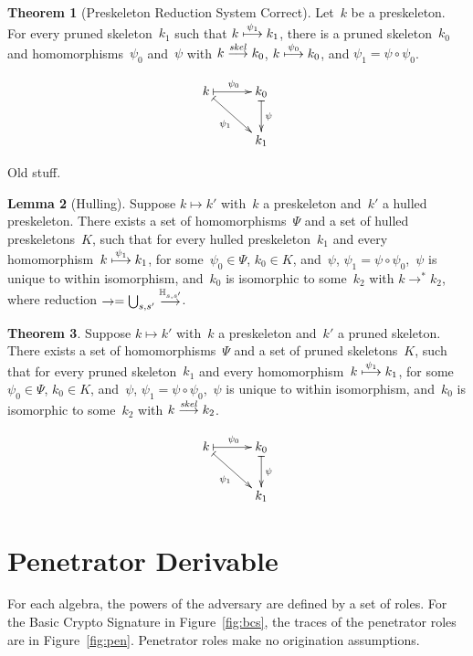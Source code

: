 \documentclass[12pt]{article}
\theoremstyle{definition}
\newtheorem{thm}{Theorem}[section]
\newtheorem{lem}[thm]{Lemma}
\newenvironment{note}{\itshape\par\noindent}{}
\begin{document}
\begin{thm}[Preskeleton Reduction System Correct]\label{thm:prsc}
Let~$k$ be a preskeleton.  For every pruned skeleton~$k_1$ such that
$k\stackrel{\psi_1}{\longmapsto}k_1$, there is a pruned skeleton~$k_0$ and
homomorphisms~$\psi_0$ and~$\psi$ with $k\stackrel{\operatorname{\mathit{skel}}}{\longrightarrow}k_0$,
$k\stackrel{\psi_0}{\longmapsto}k_0$, and $\psi_1=\psi\circ\psi_0$.

$$\xymatrix@C=3em{
k\ar@{|->}[r]^{\psi_0} \ar@{|->}[rd]_{\psi_1} &
k_0 \ar@{|->}[d]^{\psi}\\
&k_1}$$
\end{thm}

\begin{note}
Old stuff.
\end{note}

\begin{lem}[Hulling]
Suppose $k\mapsto k'$ with~$k$ a preskeleton and~$k'$ a hulled
preskeleton.  There exists a set of homomorphisms~$\Psi$ and a set of
hulled preskeletons~$K$, such that for every hulled preskeleton~$k_1$ and
every homomorphism~$k\stackrel{\psi_1}{\longmapsto}k_1$, for
some~$\psi_0\in\Psi$, $k_0\in K$, and~$\psi$,
$\psi_1=\psi\circ\psi_0$,~$\psi$ is unique to within isomorphism,
and~$k_0$ is isomorphic to some~$k_2$ with
$k\to^\ast k_2$, where reduction $\to=\bigcup_{s,s'}\stackrel{\mathbb H_{s,s'}}{\longrightarrow}$.
\end{lem}

\begin{thm}
Suppose $k\mapsto k'$ with~$k$ a preskeleton and~$k'$ a pruned
skeleton.  There exists a set of homomorphisms~$\Psi$ and a set of
pruned skeletons~$K$, such that for every pruned skeleton~$k_1$ and
every homomorphism~$k\stackrel{\psi_1}{\longmapsto}k_1$, for
some~$\psi_0\in\Psi$, $k_0\in K$, and~$\psi$,
$\psi_1=\psi\circ\psi_0$,~$\psi$ is unique to within isomorphism,
and~$k_0$ is isomorphic to some~$k_2$ with
$k\stackrel{\operatorname{\mathit{skel}}}{\longrightarrow}k_2$.

$$\xymatrix@C=3em{
k\ar@{|->}[r]^{\psi_0} \ar@{|->}[rd]_{\psi_1} &
k_0 \ar@{|->}[d]^{\psi}\\
&k_1}$$
\end{thm}

\section{Penetrator Derivable}\label{penetrator}

For each algebra, the powers of the adversary are defined by a set of
roles.  For the Basic Crypto Signature in Figure~\ref{fig:bcs}, the
traces of the penetrator roles are in Figure~\ref{fig:pen}.
Penetrator roles make no origination assumptions.
\end{document}
